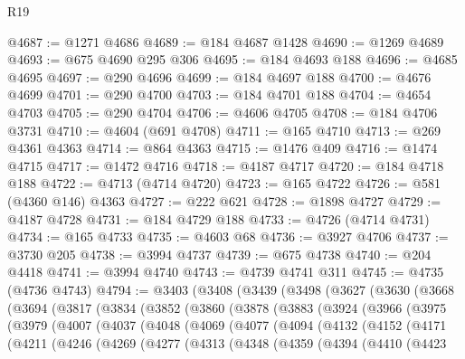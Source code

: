 \begin{lexlean}{R19}
\begin{coremodule}
@4687 := @1271 @4686
@4689 := @184 @4687 @1428
@4690 := @1269 @4689
@4693 := @675 @4690 @295 @306
@4695 := @184 @4693 @188
@4696 := @4685 @4695
@4697 := @290 @4696
@4699 := @184 @4697 @188
@4700 := @4676 @4699
@4701 := @290 @4700
@4703 := @184 @4701 @188
@4704 := @4654 @4703
@4705 := @290 @4704
@4706 := @4606 @4705
@4708 := @184 @4706 @3731
@4710 := @4604 (@691 @4708)
@4711 := @165 @4710
@4713 := @269 @4361 @4363
@4714 := @864 @4363
@4715 := @1476 @409
@4716 := @1474 @4715
@4717 := @1472 @4716
@4718 := @4187 @4717
@4720 := @184 @4718 @188
@4722 := @4713 (@4714 @4720)
@4723 := @165 @4722
@4726 := @581 (@4360 @146) @4363
@4727 := @222 @621
@4728 := @1898 @4727
@4729 := @4187 @4728
@4731 := @184 @4729 @188
@4733 := @4726 (@4714 @4731)
@4734 := @165 @4733
@4735 := @4603 @68
@4736 := @3927 @4706
@4737 := @3730 @205
@4738 := @3994 @4737
@4739 := @675 @4738
@4740 := @204 @4418
@4741 := @3994 @4740
@4743 := @4739 @4741 @311
@4745 := @4735 (@4736 @4743)
@4794 := @3403
    (@3408
      (@3439
        (@3498
          (@3627
            (@3630
              (@3668
                (@3694
                  (@3817
                    (@3834
                      (@3852
                        (@3860
                          (@3878
                            (@3883
                              (@3924
                                (@3966
                                  (@3975
                                    (@3979
                                      (@4007
                                        (@4037
                                          (@4048
                                            (@4069
                                              (@4077
                                                (@4094
                                                  (@4132
                                                    (@4152
                                                      (@4171
                                                        (@4211
                                                          (@4246
                                                            (@4269
                                                              (@4277
                                                                (@4313
                                                                  (@4348
                                                                    (@4359
                                                                      (@4394
                                                                        (@4410
                                                                          (@4423

\end{coremodule}
\end{lexlean}
